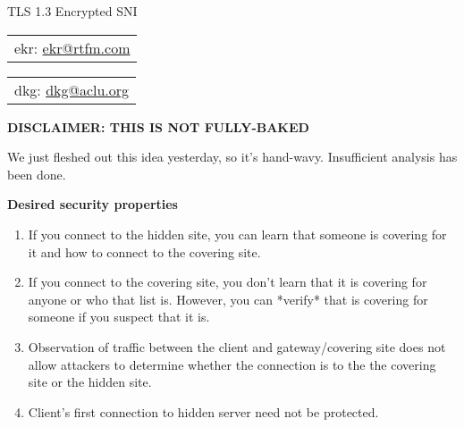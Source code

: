 \documentclass[helvetica]{seminar}
\newcommand{\heading}[1]{%
  \begin{center} 
    \large\bf 
    #1 
  \end{center} 
  \vspace{.4 in}}
\begin{document}
\begin{slide}
\begin{center}
\vspace{.5 in}
\LARGE{{\bf}TLS 1.3 Encrypted SNI}\\
\vspace{.2in}
\large{
\begin{tabular}{c}
ekr:
\url{ekr@rtfm.com}
\end{tabular}
\begin{tabular}{c}
dkg:
\url{dkg@aclu.org}
\end{tabular}
}
\end{center}

\end{slide}

\begin{slide}
\heading{DISCLAIMER: THIS IS NOT FULLY-BAKED}

We just fleshed out this idea yesterday, so it's hand-wavy. Insufficient analysis has been done.
\end{slide}


\centerslidesfalse 

\begin{slide}
\heading{Desired security properties}

\begin{enumerate}
\item If you connect to the hidden site, you can learn that someone is covering
   for it and how to connect to the covering site.
\item If you connect to the covering site, you don't learn that it is covering
   for anyone or who that list is. However, you can *verify* that is covering
   for someone if you suspect that it is.
\item Observation of traffic between the client and gateway/covering site does not allow attackers
   to determine whether the connection is to the the covering site or the
   hidden site.
\item Client's first connection to hidden server need not be protected.
\end{enumerate}

\end{slide}
\end{document}

